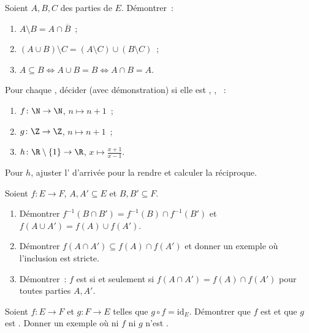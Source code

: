 \begin{exercise}[$\star$]\label{exo:b1:logic:6}
Soient $A, B, C$ des parties de $E$. Démontrer~:
\begin{enumerate}
  \item $A \setminus B = A \cap \overline{B}$~;
  \item $(A \cup B) \setminus C = (A \setminus C) \cup (B \setminus
        C)$~;
  \item $A \subseteq B \iff A \cup B = B \iff A \cap B = A$.
\end{enumerate}
\end{exercise}

\begin{exercise}[$\star\star$]\label{exo:b1:logic:7}
Pour chaque , décider (avec démonstration) si elle est
, , ~:
\begin{enumerate}
  \item $f \colon \N \to \N$, $n \mapsto n + 1$~;
  \item $g \colon \Z \to \Z$, $n \mapsto n + 1$~;
  \item $h \colon \R \setminus \{1\} \to \R$, $x \mapsto
        \frac{x+1}{x-1}$.
\end{enumerate}
Pour $h$, ajuster l' d'arrivée pour la rendre  et
calculer la réciproque.
\end{exercise}

\begin{exercise}[$\star\star$]\label{exo:b1:logic:8}
Soient $f \colon E \to F$, $A, A' \subseteq E$ et $B, B' \subseteq
F$.
\begin{enumerate}
  \item Démontrer $f^{-1}(B \cap B') = f^{-1}(B) \cap f^{-1}(B')$ et
        $f(A \cup A') = f(A) \cup f(A')$.
  \item Démontrer $f(A \cap A') \subseteq f(A) \cap f(A')$ et donner un
        exemple où l'inclusion est stricte.
  \item Démontrer~: $f$ est  si et seulement si $f(A \cap A')
        = f(A) \cap f(A')$ pour toutes parties $A, A'$.
\end{enumerate}
\end{exercise}

\begin{exercise}[$\star\star$]\label{exo:b1:logic:9}
Soient $f \colon E \to F$ et $g \colon F \to E$ telles que $g \circ f =
\mathrm{id}_E$. Démontrer que $f$ est  et que $g$ est
. Donner un exemple où ni $f$ ni $g$ n'est .
\end{exercise}

